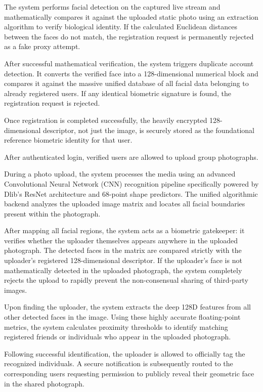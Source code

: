 The system performs facial detection on the captured live stream and mathematically compares it against the uploaded static photo using an extraction algorithm to verify biological identity. If the calculated Euclidean distances between the faces do not match, the registration request is permanently rejected as a fake proxy attempt.

After successful mathematical verification, the system triggers duplicate account detection. It converts the verified face into a 128-dimensional numerical block and compares it against the massive unified database of all facial data belonging to already registered users. If any identical biometric signature is found, the registration request is rejected. 

Once registration is completed successfully, the heavily encrypted 128-dimensional descriptor, not just the image, is securely stored as the foundational reference biometric identity for that user.

After authenticated login, verified users are allowed to upload group photographs.

During a photo upload, the system processes the media using an advanced Convolutional Neural Network (CNN) recognition pipeline specifically powered by Dlib’s ResNet architecture and 68-point shape predictors. The unified algorithmic backend analyzes the uploaded image matrix and locates all facial boundaries present within the photograph.

After mapping all facial regions, the system acts as a biometric gatekeeper: it verifies whether the uploader themselves appears anywhere in the uploaded photograph. The detected faces in the matrix are compared strictly with the uploader's registered 128-dimensional descriptor. If the uploader's face is not mathematically detected in the uploaded photograph, the system completely rejects the upload to rapidly prevent the non-consensual sharing of third-party images.

Upon finding the uploader, the system extracts the deep 128D features from all other detected faces in the image. Using these highly accurate floating-point metrics, the system calculates proximity thresholds to identify matching registered friends or individuals who appear in the uploaded photograph.

Following successful identification, the uploader is allowed to officially tag the recognized individuals. A secure notification is subsequently routed to the corresponding users requesting permission to publicly reveal their geometric face in the shared photograph.


